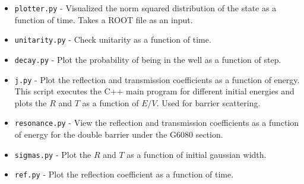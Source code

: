 \documentclass[singlepage,notitlepage,nofootinbib,11pt]{revtex4-1}
\begin{document}
\begin{itemize}
\item \texttt{plotter.py} - Visualized the norm squared distribution of the state as a function of time. Takes a ROOT file as an input.
\item \texttt{unitarity.py} - Check unitarity as a function of time.
\item \texttt{decay.py} - Plot the probability of being in the well as a function of step.
\item \texttt{j.py} - Plot the reflection and transmission coefficients as a function of energy. This script executes the C++ main program for different initial energies and plots the $R$ and $T$ as a function of $E/V$. Used for barrier scattering.
\item \texttt{resonance.py} - View the reflection and transmission coefficients as a function of energy for the double barrier under the G6080 section.
\item \texttt{sigmas.py} - Plot the $R$ and $T$ as a function of initial gaussian width.
  \item \texttt{ref.py} - Plot the reflection coefficient as a function of time.
 \end{itemize}
\end{document}
